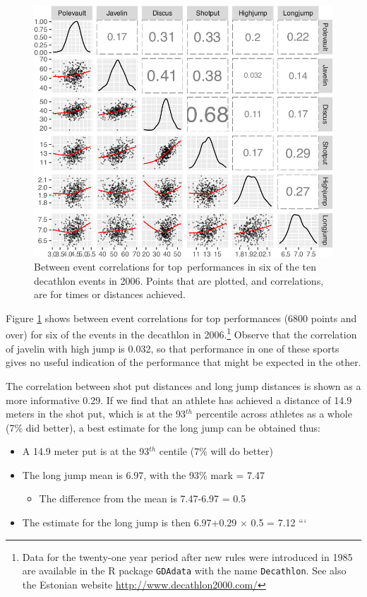 \documentclass[
  10pt,
  b5paper]{book}
\providecommand{\tightlist}{%
  \setlength{\itemsep}{0pt}\setlength{\parskip}{0pt}}
\begin{document}
\begin{figure}[H]

{\centering \includegraphics[width=0.68\linewidth]{07-regress_files/figure-latex/selected-1} 

}

\caption{Between event correlations for top performances in six
of the ten decathlon events in 2006.  Points that are plotted,
and correlations, are for times or distances achieved.}\label{fig:selected}
\end{figure}

Figure \ref{fig:selected} shows between event correlations for
top performances (6800 points and over) for six of the events
in the decathlon in
2006.\footnote{Data for the twenty-one year period after new rules were
  introduced in 1985 are available in the R package \texttt{GDAdata} with
  the name \texttt{Decathlon}. See also the Estonian website
  \url{http://www.decathlon2000.com/}} Observe that the correlation
of javelin with high jump is 0.032, so that performance in one
of these sports gives no useful indication of the performance
that might be expected in the other.

The correlation between shot put distances and long jump distances
is shown as a more informative 0.29. If we find that an athlete
has achieved a distance of 14.9 meters in the shot put, which is
at the 93\(^{th}\) percentile across athletes as a whole
(7\% did better), a best estimate for the long jump can be
obtained thus:

\begin{itemize}
\tightlist
\item
  A 14.9 meter put is at the 93\(^{th}\) centile (7\% will do better)
\item
  The long jump mean is 6.97, with the 93\% mark = 7.47

  \begin{itemize}
  \tightlist
  \item
    The difference from the mean is 7.47-6.97 = 0.5
  \end{itemize}
\item
  The estimate for the long jump is then 6.97+0.29 \(\times\) 0.5 = 7.12
  ```
\end{itemize}
\end{document}

